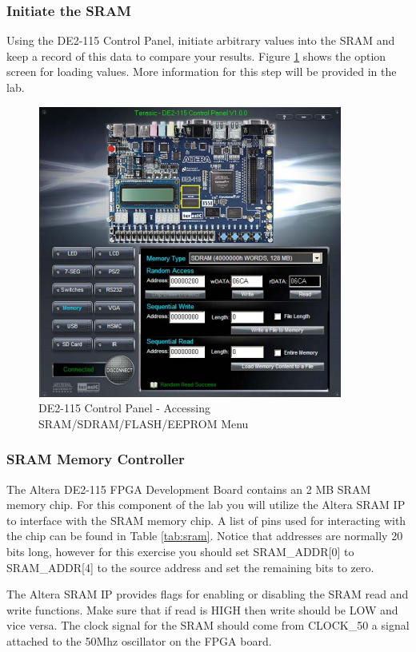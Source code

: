 \subsubsection{Initiate the SRAM}

Using the DE2-115 Control Panel, initiate arbitrary values into the SRAM and keep a record of this data to compare your results. Figure \ref{fig:controlpanel} shows the option screen for loading values. More information for this step will be provided in the lab.

\begin{figure}[H]
	\centering
	\includegraphics[width=100mm]{Lab5/figures/controlpanel.png}
	\caption{DE2-115 Control Panel - Accessing SRAM/SDRAM/FLASH/EEPROM Menu}
	\label{fig:controlpanel}
\end{figure}

\subsubsection{SRAM Memory Controller}
The Altera DE2-115 FPGA Development Board contains an 2 MB SRAM memory chip. For this component of the lab you will utilize the Altera SRAM IP to interface with the SRAM memory chip. A list of pins used for interacting with the chip can be found in Table \ref{tab:sram}. Notice that addresses are normally 20 bits long, however for this exercise you should set SRAM\_ADDR[0]  to SRAM\_ADDR[4] to the source address and set the remaining bits to zero. 

The Altera SRAM IP provides flags for enabling or disabling the SRAM read and write functions. Make sure that if read is HIGH then write should be LOW and vice versa. The clock signal for the SRAM should come from CLOCK\_50 a signal attached to the 50Mhz oscillator on the FPGA board.

